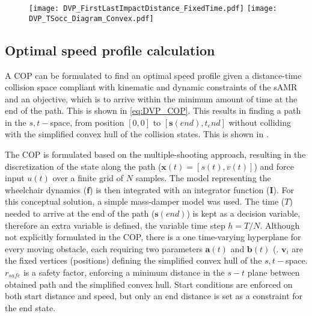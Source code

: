 \begin{figure}[!htbp]
\centering
\texttt{[image: DVP\_FirstLastImpactDistance\_FixedTime.pdf]}
\hfill
\texttt{[image: DVP\_TSocc\_Diagram\_Convex.pdf]}
\end{figure}

\newpage

\subsection{Optimal speed profile calculation} \label{sec:OSPCOP}
A COP can be formulated to find an optimal speed profile given a distance-time collision space compliant with kinematic and dynamic constraints of the sAMR and an objective, which is to arrive within the minimum amount of time at the end of the path. This is shown in \cref{eq:DVP_COP}. This results in finding a path in the $s,t-$space, from position $[0,0]$ to $[\bm{s}(end), t_end]$ without colliding with the simplified convex hull of the collision states. This is shown in .

The COP is formulated based on the multiple-shooting approach, resulting in the discretization of the state along the path ($\bm{x}(t)=[s(t),v(t)]$) and force input $u(t)$ over a finite grid of $N$ samples. The model representing the wheelchair dynamics ($\bm{f}$) is then integrated with an integrator function ($\bm{I}$). For this conceptual solution, a simple mass-damper model was used. The time ($T$) needed to arrive at the end of the path ($\bm{s}(end)$) is kept as a decision variable, therefore an extra variable is defined, the variable time step $h=T/N$. Although not explicitly formulated in the COP, there is a one time-varying hyperplane for every moving obstacle, each requiring two parameters $\bm{a}(t)$ and $\bm{b}(t)$ (\cite{MercyEtAl2016}. $\bm{v}_{i}$ are the fixed vertices (positions) defining the simplified convex hull of the $s,t-$space. $r_{safe}$ is a safety factor, enforcing a minimum distance in the $s-t$ plane between obtained path and the simplified convex hull. Start conditions are enforced on both start distance and speed, but only an end distance is set as a constraint for the end state.

